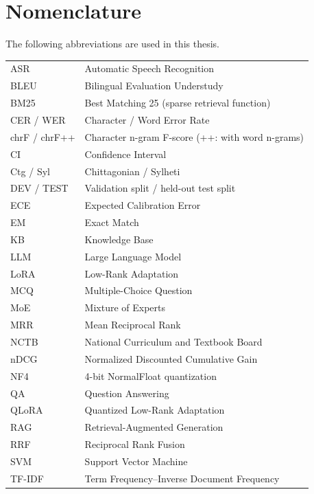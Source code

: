 \chapter*{Nomenclature}
The following abbreviations are used in this thesis.
\begin{longtable}{@{}p{}p{}@{}}
ASR & Automatic Speech Recognition\\
BLEU & Bilingual Evaluation Understudy\\
BM25 & Best Matching 25 (sparse retrieval function)\\
CER / WER & Character / Word Error Rate\\
chrF / chrF++ & Character n-gram F-score (++: with word n-grams)\\
CI & Confidence Interval\\
Ctg / Syl & Chittagonian / Sylheti\\
DEV / TEST & Validation split / held-out test split\\
ECE & Expected Calibration Error\\
EM & Exact Match\\
KB & Knowledge Base\\
LLM & Large Language Model\\
LoRA & Low-Rank Adaptation\\
MCQ & Multiple-Choice Question\\
MoE & Mixture of Experts\\
MRR & Mean Reciprocal Rank\\
NCTB & National Curriculum and Textbook Board\\
nDCG & Normalized Discounted Cumulative Gain\\
NF4 & 4-bit NormalFloat quantization\\
QA & Question Answering\\
QLoRA & Quantized Low-Rank Adaptation\\
RAG & Retrieval-Augmented Generation\\
RRF & Reciprocal Rank Fusion\\
SVM & Support Vector Machine\\
TF-IDF & Term Frequency--Inverse Document Frequency\\
\end{longtable}
\clearpage
